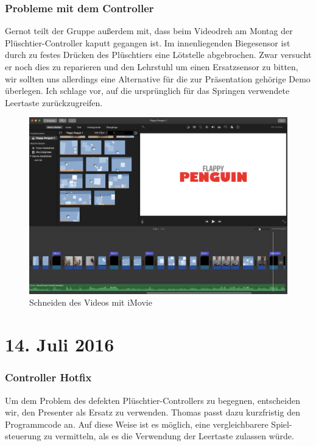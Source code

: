 \documentclass{report}
\begin{document}
\subsubsection*{Probleme mit dem Controller}

Gernot teilt der Gruppe außerdem mit, dass beim Videodreh am Montag der Plüschtier-Controller kaputt gegangen ist. Im innenliegenden Biegesensor ist durch zu festes Drücken des Plüschtiers eine Lötstelle abgebrochen. Zwar versucht er noch dies zu reparieren und den Lehrstuhl um einen Ersatzsensor zu bitten, wir sollten uns allerdings eine Alternative für die zur Präsentation gehörige Demo überlegen. Ich schlage vor, auf die ursprünglich für das Springen verwendete Leertaste zurückzugreifen.

\begin{figure}
	\includegraphics[width=120mm]{img/movie}
	\caption{Schneiden des Videos mit iMovie}
	\label{fig:movie}
\end{figure}



\section*{14. Juli 2016}

\subsubsection{Controller Hotfix}

Um dem Problem des defekten Plüschtier-Controllers zu begegnen, entscheiden wir, den Presenter als Ersatz zu verwenden. Thomas passt dazu kurzfristig den Programmcode an. Auf diese Weise ist es möglich, eine vergleichbarere Spiel-\linebreak steuerung zu vermitteln, als es die Verwendung der Leertaste zulassen würde.
\end{document}

